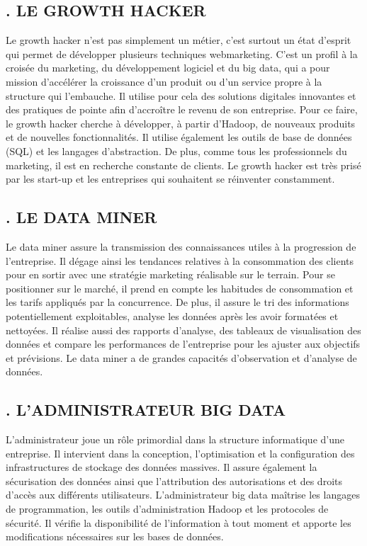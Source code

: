 \subsection*{. LE GROWTH HACKER}
Le growth hacker n'est pas simplement un métier, c'est surtout un état d'esprit qui permet de développer plusieurs techniques webmarketing. C'est un profil à la croisée du marketing, du développement logiciel et du big data, qui a pour mission d'accélérer la croissance d'un produit ou d'un service propre à la structure qui l'embauche. Il utilise pour cela des solutions digitales innovantes et des pratiques de pointe afin d'accroître le revenu de son entreprise. Pour ce faire, le growth hacker cherche à développer, à partir d'Hadoop, de nouveaux produits et de nouvelles fonctionnalités. Il utilise également les outils de base de données (SQL) et les langages d'abstraction. De plus, comme tous les professionnels du marketing, il est en recherche constante de clients. Le growth hacker est très prisé par les start-up et les entreprises qui souhaitent se réinventer constamment. 

\subsection*{. LE DATA MINER}
Le data miner assure la transmission des connaissances utiles à la progression de l'entreprise. Il dégage ainsi les tendances relatives à la consommation des clients pour en sortir avec une stratégie marketing réalisable sur le terrain. Pour se positionner sur le marché, il prend en compte les habitudes de consommation et les tarifs appliqués par la concurrence. De plus, il assure le tri des informations potentiellement exploitables, analyse les données après les avoir formatées et nettoyées. Il réalise aussi des rapports d'analyse, des tableaux de visualisation des données et compare les performances de l'entreprise pour les ajuster aux objectifs et prévisions. Le data miner a de grandes capacités d'observation et d'analyse de données.

\subsection*{. L'ADMINISTRATEUR BIG DATA}
L'administrateur joue un rôle primordial dans la structure informatique d'une entreprise. Il intervient dans la conception, l'optimisation et la configuration des infrastructures de stockage des données massives. Il assure également la sécurisation des données ainsi que l'attribution des autorisations et des droits d'accès aux différents utilisateurs. L'administrateur big data maîtrise les langages de programmation, les outils d'administration Hadoop et les protocoles de sécurité. Il vérifie la disponibilité de l'information à tout moment et apporte les modifications nécessaires sur les bases de données.

\cite{jvc_les_2020}